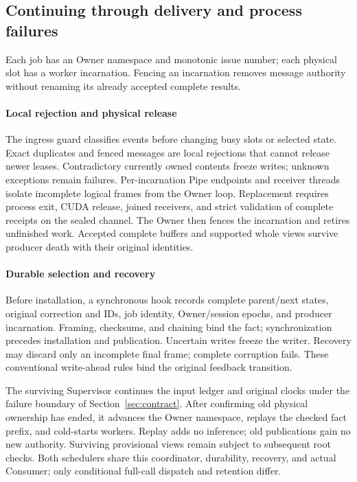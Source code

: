 \subsection{Continuing through delivery and process failures}
\label{subsec:native_resilience}
Each job has an Owner namespace and monotonic issue number; each physical
slot has a worker incarnation. Fencing an incarnation removes message
authority without renaming its already accepted complete results.

\paragraph{Local rejection and physical release}
The ingress guard classifies events before changing busy slots or selected
state. Exact duplicates and fenced messages are local rejections that
cannot release newer leases. Contradictory currently owned contents freeze
writes; unknown exceptions remain failures. Per-incarnation Pipe endpoints
and receiver threads isolate incomplete logical frames from the Owner
loop. Replacement requires process exit, CUDA release, joined receivers,
and strict validation of complete receipts on the sealed channel. The
Owner then fences the incarnation and retires unfinished work. Accepted
complete buffers and supported whole views survive producer death with
their original identities.

\paragraph{Durable selection and recovery}
Before installation, a synchronous hook records complete parent/next
states, original correction and IDs, job identity, Owner/session epochs,
and producer incarnation. Framing, checksums, and chaining bind the fact;
synchronization precedes installation and publication. Uncertain writes
freeze the writer. Recovery may discard only an incomplete final frame;
complete corruption fails. These conventional write-ahead rules
\cite{mohan1992aries} bind the original feedback transition.

The surviving Supervisor continues the input ledger and original clocks
under the failure boundary of Section~\ref{sec:contract}. After confirming
old physical ownership has ended, it advances the Owner namespace,
replays the checked fact prefix, and cold-starts workers. Replay adds no
inference; old publications gain no new authority. Surviving provisional
views remain subject to subsequent root checks. Both schedulers share
this coordinator, durability, recovery, and actual Consumer; only
conditional full-call dispatch and retention differ.

